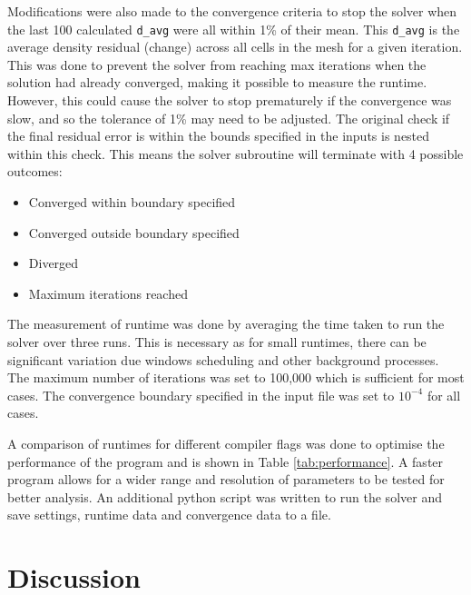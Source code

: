 \documentclass{article}
\begin{document}
Modifications were also made to the convergence criteria to stop the solver when the last 100 calculated \texttt{d\_avg} were all within 1\% of their mean.
This \texttt{d\_avg} is the average density residual (change) across all cells in the mesh for a given iteration.
This was done to prevent the solver from reaching max iterations when the solution had already converged, making it possible to measure the runtime.
However, this could cause the solver to stop prematurely if the convergence was slow, and so the tolerance of 1\% may need to be adjusted.
The original check if the final residual error is within the bounds specified in the inputs is nested within this check.
This means the solver subroutine will terminate with 4 possible outcomes:

\begin{itemize}
    \item Converged within boundary specified
    \item Converged outside boundary specified
    \item Diverged
    \item Maximum iterations reached
\end{itemize}

The measurement of runtime was done by averaging the time taken to run the solver over three runs.
This is necessary as for small runtimes, there can be significant variation due windows scheduling and other background processes.
The maximum number of iterations was set to 100,000 which is sufficient for most cases.
The convergence boundary specified in the input file was set to $10^{-4}$ for all cases.

A comparison of runtimes for different compiler flags was done to optimise the performance of the program and is shown in Table \ref{tab:performance}.
A faster program allows for a wider range and resolution of parameters to be tested for better analysis.
An additional python script was written to run the solver and save settings, runtime data and convergence data to a file.


\section{Discussion}


\end{document}
